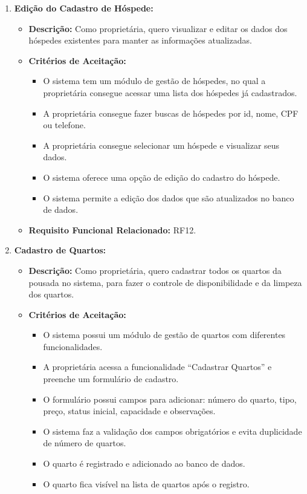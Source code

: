 \documentclass[
	12pt,				%
	openany,			%
	oneside,			%
	a4paper,			%
	english,			%
	french,				%
	spanish,			%
	brazil				%
	]{abntex2}
\begin{document}
\begin{enumerate}[label=\textbf{\arabic*.}]
\begin{itemize}
	\end{itemize} 
	\item \textbf{Edição do Cadastro de Hóspede:}
	\begin{itemize}
		\item \textbf{Descrição:} Como proprietária, quero visualizar e editar os dados dos hóspedes existentes para manter as informações atualizadas.
		\item \textbf{Critérios de Aceitação:}
		\begin{itemize}
			\item O sistema tem um módulo de gestão de hóspedes, no qual a proprietária consegue acessar uma lista dos hóspedes já cadastrados.
			\item A proprietária consegue fazer buscas de hóspedes por id, nome, CPF ou telefone.
			\item A proprietária consegue selecionar um hóspede e visualizar seus dados.
			\item O sistema oferece uma opção de edição do cadastro do hóspede.
			\item O sistema permite a edição dos dados que são atualizados no banco de dados.
		\end{itemize}
		\item \textbf{Requisito Funcional Relacionado:} RF12.
	\end{itemize} 
	\item \textbf{Cadastro de Quartos:}
	\begin{itemize}
		\item \textbf{Descrição:} Como proprietária, quero cadastrar todos os quartos da pousada no sistema, para fazer o controle de disponibilidade e da limpeza dos quartos.
		\item \textbf{Critérios de Aceitação:}
		\begin{itemize}
			\item O sistema possui um módulo de gestão de quartos com diferentes funcionalidades.
			\item A proprietária acessa a funcionalidade “Cadastrar Quartos” e preenche um formulário de cadastro.
			\item O formulário possui campos para adicionar: número do quarto, tipo, preço, status inicial, capacidade e observações.
			\item O sistema faz a validação dos campos obrigatórios e evita duplicidade de número de quartos.
			\item O quarto é registrado e adicionado ao banco de dados.
			\item O quarto fica visível na lista de quartos após o registro.

\end{itemize}
\end{itemize}
\end{enumerate}
\end{document}
